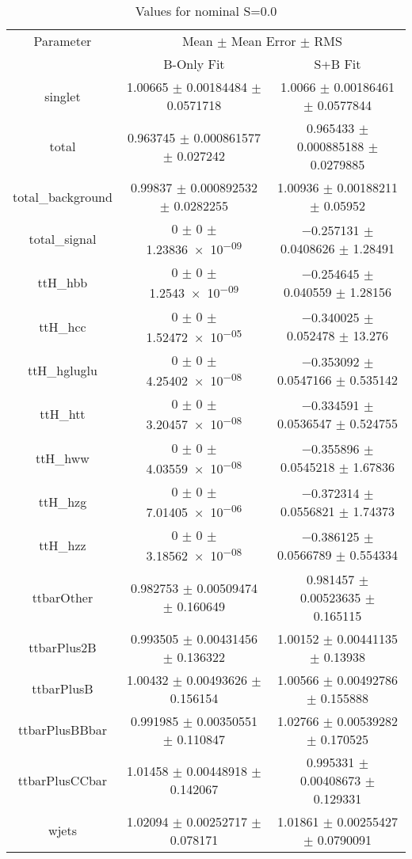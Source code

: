 \begin{table}
\centering
\caption{Values for nominal S=0.0}
\begin{tabular}{ccc}
\toprule
Parameter & \multicolumn{2}{c}{Mean $\pm$ Mean Error $\pm$ RMS}\\
 & B-Only Fit & S+B Fit\\
\midrule
singlet & \num{1.00665} $\pm$ \num{0.00184484} $\pm$ \num{0.0571718} & \num{1.0066} $\pm$ \num{0.00186461} $\pm$ \num{0.0577844}\\
total & \num{0.963745} $\pm$ \num{0.000861577} $\pm$ \num{0.027242} & \num{0.965433} $\pm$ \num{0.000885188} $\pm$ \num{0.0279885}\\
total\_background & \num{0.99837} $\pm$ \num{0.000892532} $\pm$ \num{0.0282255} & \num{1.00936} $\pm$ \num{0.00188211} $\pm$ \num{0.05952}\\
total\_signal & \num{0} $\pm$ \num{0} $\pm$ \num{1.23836e-09} & \num{-0.257131} $\pm$ \num{0.0408626} $\pm$ \num{1.28491}\\
ttH\_hbb & \num{0} $\pm$ \num{0} $\pm$ \num{1.2543e-09} & \num{-0.254645} $\pm$ \num{0.040559} $\pm$ \num{1.28156}\\
ttH\_hcc & \num{0} $\pm$ \num{0} $\pm$ \num{1.52472e-05} & \num{-0.340025} $\pm$ \num{0.052478} $\pm$ \num{13.276}\\
ttH\_hgluglu & \num{0} $\pm$ \num{0} $\pm$ \num{4.25402e-08} & \num{-0.353092} $\pm$ \num{0.0547166} $\pm$ \num{0.535142}\\
ttH\_htt & \num{0} $\pm$ \num{0} $\pm$ \num{3.20457e-08} & \num{-0.334591} $\pm$ \num{0.0536547} $\pm$ \num{0.524755}\\
ttH\_hww & \num{0} $\pm$ \num{0} $\pm$ \num{4.03559e-08} & \num{-0.355896} $\pm$ \num{0.0545218} $\pm$ \num{1.67836}\\
ttH\_hzg & \num{0} $\pm$ \num{0} $\pm$ \num{7.01405e-06} & \num{-0.372314} $\pm$ \num{0.0556821} $\pm$ \num{1.74373}\\
ttH\_hzz & \num{0} $\pm$ \num{0} $\pm$ \num{3.18562e-08} & \num{-0.386125} $\pm$ \num{0.0566789} $\pm$ \num{0.554334}\\
ttbarOther & \num{0.982753} $\pm$ \num{0.00509474} $\pm$ \num{0.160649} & \num{0.981457} $\pm$ \num{0.00523635} $\pm$ \num{0.165115}\\
ttbarPlus2B & \num{0.993505} $\pm$ \num{0.00431456} $\pm$ \num{0.136322} & \num{1.00152} $\pm$ \num{0.00441135} $\pm$ \num{0.13938}\\
ttbarPlusB & \num{1.00432} $\pm$ \num{0.00493626} $\pm$ \num{0.156154} & \num{1.00566} $\pm$ \num{0.00492786} $\pm$ \num{0.155888}\\
ttbarPlusBBbar & \num{0.991985} $\pm$ \num{0.00350551} $\pm$ \num{0.110847} & \num{1.02766} $\pm$ \num{0.00539282} $\pm$ \num{0.170525}\\
ttbarPlusCCbar & \num{1.01458} $\pm$ \num{0.00448918} $\pm$ \num{0.142067} & \num{0.995331} $\pm$ \num{0.00408673} $\pm$ \num{0.129331}\\
wjets & \num{1.02094} $\pm$ \num{0.00252717} $\pm$ \num{0.078171} & \num{1.01861} $\pm$ \num{0.00255427} $\pm$ \num{0.0790091}\\
\bottomrule
\end{tabular}
\end{table}